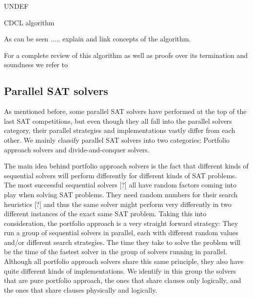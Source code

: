 \documentclass{llncs}
\begin{document}
\begin{algorithm}
  \BlankLine
  \Status \assign UNDEF\;

  \caption{CDCL algorithm}
\label{alg:CDCL}
\end{algorithm}

As can be seen ..... explain and link concepts of the algorithm.

For a complete review of this algorithm as well as proofs over its
termination and soundness we refer to \cite{Nieuwenhuisetal2006JACM}


\subsection{Parallel SAT solvers}

As mentioned before, some parallel SAT solvers have performed at the top of the last SAT competitions, but even though they all fall into the parallel solvers category, their parallel strategies and implementations vastly differ from each other. We mainly classify parallel SAT solvers into two categories: Portfolio approach solvers and divide-and-conquer solvers.

The main idea behind portfolio approach solvers is the fact that different kinds of sequential solvers will perform differently for different kinds of SAT problems. The most successful sequential solvers [?] all have random factors coming into play when solving SAT problems. They need random numbers for their search heuristics [?] and thus the same solver might perform very differently in two different instances of the exact same SAT problem. Taking this into consideration, the portfolio approach is a very straight forward strategy: They run a group of sequential solvers in parallel, each with different random values and/or different search strategies. The time they take to solve the problem will be the time of the fastest solver in the group of solvers running in parallel. Although all portfolio approach solvers share this same principle, they also have quite different kinds of implementations. We identify in this group the solvers that are pure portfolio approach, the ones that share clauses only logically, and the ones that share clauses physically and logically.
\end{document}
